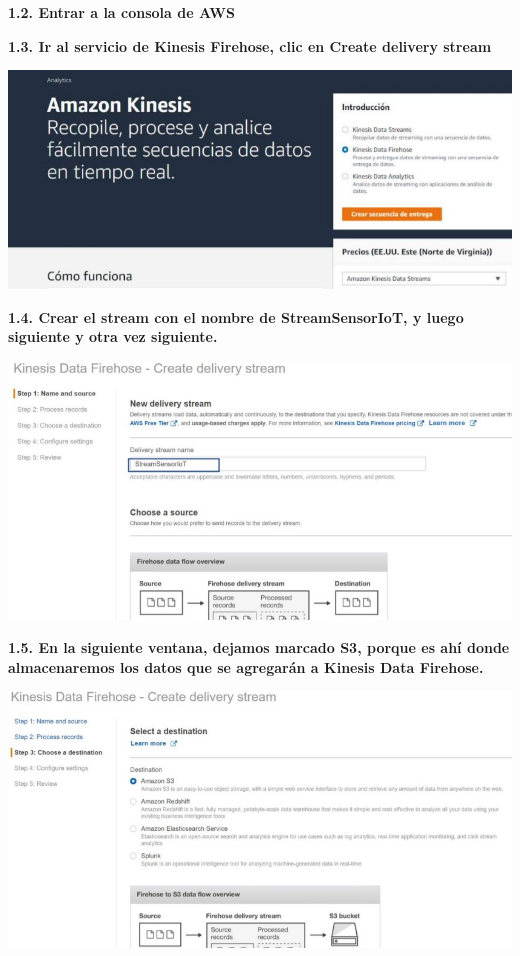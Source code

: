 \documentclass{article}
\begin{document}
\textbf{1.2.  Entrar a la consola de AWS}

\textbf{1.3.  Ir al servicio de Kinesis Firehose, clic en Create delivery stream
}

    \begin{center}
		\includegraphics[width=15cm]{./images/2} 
	\end{center}

\newpage
\textbf{1.4.  Crear el stream con el nombre de StreamSensorIoT, y luego siguiente y otra vez siguiente.
}

    \begin{center}
		\includegraphics[width=15cm]{./images/3} 
	\end{center}
	
	\newpage
\textbf{1.5.   En la siguiente ventana, dejamos marcado S3, porque es ahí donde almacenaremos los datos que se
agregarán a Kinesis Data Firehose.
}

    \begin{center}
		\includegraphics[width=15cm]{./images/4} 
	\end{center}
	
\end{document}
